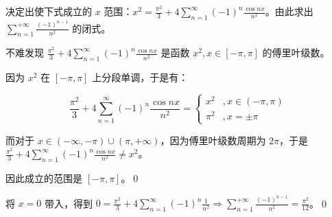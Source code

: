 \begin{ques}
	决定出使下式成立的 $\displaystyle x$ 范围：$\displaystyle x^{2} =\frac{\pi ^{2}}{3} +4\sum _{n=1}^{\infty }( -1)^{n}\frac{\cos nx}{n^{2}}$。由此求出 $\displaystyle \sum _{n=1}^{+\infty }\frac{( -1)^{n-1}}{n^{2}}$ 的闭式。
\end{ques}



不难发现 $\displaystyle \frac{\pi ^{2}}{3} +4\sum _{n=1}^{\infty }( -1)^{n}\frac{\cos nx}{n^{2}}$ 是函数 $\displaystyle x^{2} ,x\in [ -\pi ,\pi ]$ 的傅里叶级数。

因为 $\displaystyle x^{2}$ 在 $\displaystyle [ -\pi ,\pi ]$ 上分段单调，于是有：


\begin{equation*}
	\frac{\pi ^{2}}{3} +4\sum _{n=1}^{\infty }( -1)^{n}\frac{\cos nx}{n^{2}} =\begin{cases}
		x^{2} & ,x\in ( -\pi ,\pi )\\
		\pi ^{2} & ,x=\pm \pi 
	\end{cases}
\end{equation*}


而对于 $\displaystyle x\in ( -\infty ,-\pi ) \cup ( \pi ,+\infty )$，因为傅里叶级数周期为 $\displaystyle 2\pi $，于是 $ $$\displaystyle \frac{\pi ^{2}}{3} +4\sum _{n=1}^{\infty }( -1)^{n}\frac{\cos nx}{n^{2}} \neq x^{2}$。

因此成立的范围是 $\displaystyle [ -\pi ,\pi ]$。\qed 

将 $\displaystyle x=0$ 带入，得到 $\displaystyle 0=\frac{\pi ^{2}}{3} +4\sum _{n=1}^{\infty }( -1)^{n}\frac{1}{n^{2}} \Rightarrow \sum _{n=1}^{+\infty }\frac{( -1)^{n-1}}{n^{2}} =\frac{\pi ^{2}}{12}$。\qed 
\ifx\allfiles\undefined

\fi